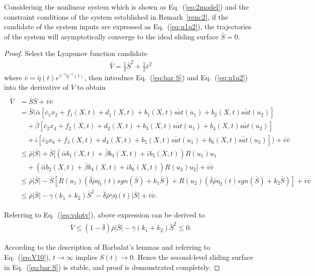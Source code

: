 \begin{theorem}
Considerinig the nonlinear system which is shown as Eq.~(\ref{eq:2model}) and the constraint conditions of the system established in Remark~\ref{rem:2}, if the candidate of the system inputs are expressed as Eq.~(\ref{eq:u1u2}), the trajectories of the system will asymptotically converge to the ideal sliding surface $\bar S=0$.\label{theorem:3}
\end{theorem}
\begin{proof}
Select the Lyapunov function candidate
\begin{align}
\bar V = \frac{1}{2}\bar S^2 + \frac{1}{2}\bar v^2
\end{align}
where $\bar v = {\bar\eta}(t)e^{\bar\gamma^{-1}{\bar\eta}^{-1}(t)}$, then introduce Eq.~(\ref{eq:bar S}) and Eq.~(\ref{eq:u1u2}) into the derivative of $V$ to obtain
\begin{align}
\begin{split}
\dot{\bar V} &= \bar{S}\dot{\bar{S}}+\bar v\dot{\bar v}\\
                &= \bar{S}(\bar\alpha[\bar c_1 x_2 + f_1(X,t) + d_1(X,t) + b_1(X,t)\bar{sat}(u_1) + b_2(X,t)\bar{sat}(u_2)]\\
                     &\quad+         \bar\beta [\bar c_2 x_4 + f_2(X,t) + d_2(X,t) + b_3(X,t)\bar{sat}(u_1) + b_4(X,t)\bar{sat}(u_2)]\\
                     &\quad+         \bar\iota[\bar c_3 x_6 + f_3(X,t) + d_3(X,t) + b_5(X,t)\bar{sat}(u_1) + b_6(X,t)\bar{sat}(u_2)])+\bar v\dot{\bar v}\\
                     &\le \bar\rho\vert\bar S\vert + \bar S[(\bar\alpha b_1(X,t) + \bar\beta b_3(X,t) + \bar\iota b_5(X,t))R(u_1)u_1\\
                     &\quad+(\bar\alpha b_2(X,t) + \bar\beta b_4(X,t) + \bar\iota b_6(X,t))R(u_2)u_2]+\bar v\dot{\bar v}\\
                     &\le \bar\rho\vert\bar S\vert - \bar S[ R(u_1)(\bar\delta\bar\rho\eta_1(t)sgn(\bar S)+k_1\bar S)+R(u_2)(\bar\delta\bar\rho\eta_2(t)sgn(\bar S)+k_2\bar S)]+\bar v\dot{\bar v}\\
                     &\le \bar\rho\vert\bar S\vert - \gamma(k_1+k_2)\bar S^2 - \bar\delta\bar\rho\bar\gamma\bar\eta(t)\vert\bar S\vert+\bar v\dot{\bar v}.
\end{split}
\end{align}\par
Referring to Eq.~(\ref{eq:vdotv}), above expression can be derived to
\begin{align}
\dot{\bar V} \le (1 -\bar\delta)\bar\rho\vert\bar S\vert- \bar\gamma(k_1+k_2)\bar S^2\le 0 .\label{eq:dotbarVfinal}
\end{align}\par
According to the description of Barbalat's lemmas and referring to Eq.~(\ref{eq:V10}), $t\to\infty$ implies $S(t)\to 0$. Hence the second-level sliding surface in Eq.~(\ref{eq:bar S}) is stable, and proof is demonstrated completely.
\end{proof}

